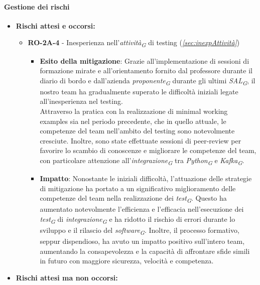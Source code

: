 \paragraph{Gestione dei rischi}

\begin{itemize}
    \item \textbf{Rischi attesi e occorsi:}
    \begin{itemize}
        \item \textbf{RO-2A-4} - Inesperienza nell'\textit{attività}\textsubscript{\textit{G}} di testing (\textit{\ref{sec:inexpAttività}})
        \begin{itemize}
            \item \textbf{Esito della mitigazione}: Grazie all'implementazione di sessioni di formazione mirate e all'orientamento fornito dal professore durante il diario di bordo e dall'azienda \textit{proponente}\textsubscript{\textit{G}} durante gli ultimi \textit{SAL}\textsubscript{\textit{G}}, il nostro team ha gradualmente superato le difficoltà iniziali legate all'inesperienza nel testing. \\
            Attraverso la pratica con la realizzazione di minimal working examples sia nel periodo precedente, che in quello attuale, le competenze del team nell'ambito del testing sono notevolmente cresciute. Inoltre, sono state effettuate sessioni di peer-review per favorire lo scambio di conoscenze e migliorare le competenze del team, con particolare attenzione all'\textit{integrazione}\textsubscript{\textit{G}} tra \textit{Python}\textsubscript{\textit{G}} e \textit{Kafka}\textsubscript{\textit{G}}.
            \item \textbf{Impatto}: Nonostante le iniziali difficoltà, l'attuazione delle strategie di mitigazione ha portato a un significativo miglioramento delle competenze del team nella realizzazione dei \textit{test}\textsubscript{\textit{G}}. Questo ha aumentato notevolmente l'efficienza e l'efficacia nell'esecuzione dei \textit{test}\textsubscript{\textit{G}} di \textit{integrazione}\textsubscript{\textit{G}} e ha ridotto il rischio di errori durante lo sviluppo e il rilascio del \textit{software}\textsubscript{\textit{G}}. Inoltre, il processo formativo, seppur dispendioso, ha avuto un impatto positivo sull'intero team, aumentando la consapevolezza e la capacità di affrontare sfide simili in futuro con maggiore sicurezza, velocità e competenza.
        \end{itemize}
    \end{itemize}
\item \textbf{Rischi attesi ma non occorsi:}

\end{itemize}

